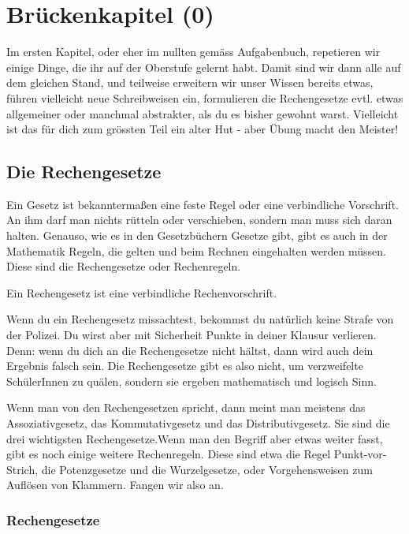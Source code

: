 \chapter{Brückenkapitel (0)}
Im ersten Kapitel, oder eher im nullten gemäss Aufgabenbuch, repetieren wir einige Dinge, die ihr auf der Oberstufe gelernt habt.
Damit sind wir dann alle auf dem gleichen Stand, und teilweise erweitern wir unser Wissen bereits etwas, führen vielleicht neue Schreibweisen ein, formulieren die Rechengesetze evtl. etwas allgemeiner oder manchmal abstrakter, als du es bisher gewohnt warst. Vielleicht ist das für dich zum grössten Teil ein alter Hut - aber Übung macht den Meister!

\section{Die Rechengesetze}
Ein Gesetz ist bekanntermaßen eine feste Regel oder eine verbindliche Vorschrift. An ihm darf man nichts rütteln oder verschieben, sondern man muss sich daran halten.
Genauso, wie es in den Gesetzbüchern Gesetze gibt, gibt es auch in der Mathematik Regeln, die gelten und beim Rechnen eingehalten werden müssen.
Diese sind die Rechengesetze oder Rechenregeln.

\begin{tcolorbox}[colback=green!10!white,colframe=green!70!black,title=Rechengesetz,width=.9\linewidth]
		Ein Rechengesetz ist eine verbindliche Rechenvorschrift.
\end{tcolorbox}

Wenn du ein Rechengesetz missachtest, bekommst du natürlich keine Strafe von der Polizei. Du wirst aber mit Sicherheit Punkte in deiner Klausur verlieren.
Denn: wenn du dich an die Rechengesetze nicht hältst, dann wird auch dein Ergebnis falsch sein.
Die Rechengesetze gibt es also nicht, um verzweifelte SchülerInnen zu quälen, sondern sie ergeben mathematisch und logisch Sinn.

Wenn man von den Rechengesetzen spricht, dann meint man meistens das Assoziativgesetz, das Kommutativgesetz und das Distributivgesetz.
Sie sind die drei wichtigsten Rechengesetze.Wenn man den Begriff aber etwas weiter fasst, gibt es noch einige weitere Rechenregeln.
Diese sind etwa die Regel Punkt-vor-Strich, die Potenzgesetze und die Wurzelgesetze, oder Vorgehensweisen zum Auflösen von Klammern.
Fangen wir also an.

\subsection{Rechengesetze}

